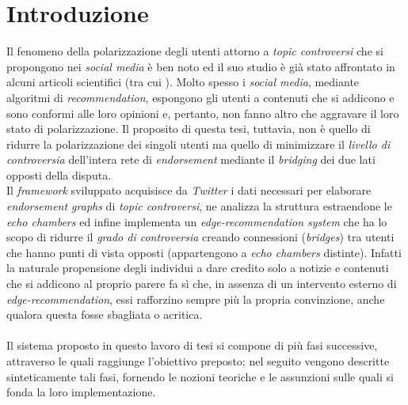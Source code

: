 \chapter{Introduzione}
\label{chap:introduzione}

Il fenomeno della polarizzazione degli utenti attorno a \textit{topic controversi} che si propongono nei \textit{social media} è ben noto ed il suo studio è già stato affrontato in alcuni articoli scientifici (tra cui \cite{musco:paper}\cite{morales:paper}). Molto spesso i \textit{social media}, mediante algoritmi di \textit{recommendation}, espongono gli utenti a contenuti che si addicono e sono conformi alle loro opinioni e, pertanto, non fanno altro che aggravare il loro stato di polarizzazione. Il proposito di questa tesi, tuttavia, non è quello di ridurre la polarizzazione dei singoli utenti ma quello di minimizzare il \textit{livello di controversia} dell'intera rete di \textit{endorsement} mediante il \textit{bridging} dei due lati opposti della disputa.\\Il \textit{framework} sviluppato acquisisce da \textit{Twitter} i dati necessari per elaborare \textit{endorsement graphs} di \textit{topic controversi}, ne analizza la struttura estraendone le \textit{echo chambers} ed infine implementa un \textit{edge-recommendation system} che ha lo scopo di ridurre il \textit{grado di controversia} creando connessioni (\textit{bridges}) tra utenti che hanno punti di vista opposti (appartengono a \textit{echo chambers} distinte). Infatti la naturale propensione degli individui a dare credito solo a notizie e contenuti che si addicono al proprio parere fa sì che, in assenza di un intervento esterno di \textit{edge-recommendation}, essi rafforzino sempre più la propria convinzione, anche qualora questa fosse sbagliata o acritica.\\\\Il sistema proposto in questo lavoro di tesi si compone di più fasi successive, attraverso le quali raggiunge l'obiettivo preposto; nel seguito vengono descritte sinteticamente tali fasi, fornendo le nozioni teoriche e le assunzioni sulle quali si fonda la loro implementazione.
